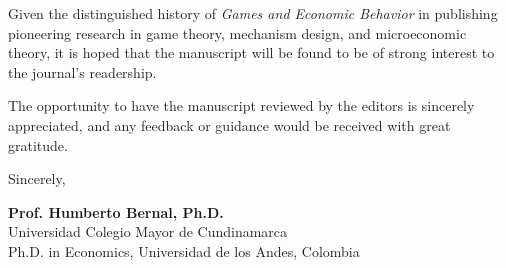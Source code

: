 \documentclass[12pt]{article}
\begin{document}
Given the distinguished history of \textit{Games and Economic Behavior} in publishing pioneering research in game theory, mechanism design, and microeconomic theory, it is hoped that the manuscript will be found to be of strong interest to the journal's readership.

The opportunity to have the manuscript reviewed by the editors is sincerely appreciated, and any feedback or guidance would be received with great gratitude.

\vspace{2.5em}

\begin{flushleft}
Sincerely,

\vspace{2.5em}

\textbf{Prof. Humberto Bernal, Ph.D.} \\
Universidad Colegio Mayor de Cundinamarca \\
Ph.D. in Economics, Universidad de los Andes, Colombia
\end{flushleft}
\end{document}
